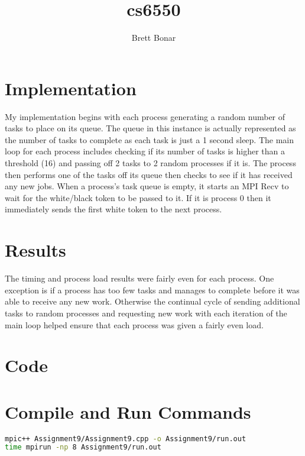 \documentclass{article}
\title{cs6550}
\author{ Brett Bonar }
\begin{document}
\maketitle

\section{Implementation}
My implementation begins with each process generating a random number of tasks to place on its queue. The queue in this instance is actually represented as the number of tasks to complete as each task is just a 1 second sleep.
The main loop for each process includes checking if its number of tasks is higher than a threshold (16) and passing off 2 tasks to 2 random processes if it is. The process then performs one of the tasks off its queue then checks to see if it has received any new jobs.
When a process's task queue is empty, it starts an MPI Recv to wait for the white/black token to be passed to it. If it is process 0 then it immediately sends the first white token to the next process.

\section{Results}
The timing and process load results were fairly even for each process. One exception is if a process has too few tasks and manages to complete before it was able to receive any new work. Otherwise the continual cycle of sending additional tasks to random processes and requesting new work with each iteration of the main loop helped ensure that each process was given a fairly even load.

\section{Code}



\section{Compile and Run Commands}
\begin{lstlisting}[language=bash]
mpic++ Assignment9/Assignment9.cpp -o Assignment9/run.out
time mpirun -np 8 Assignment9/run.out
\end{lstlisting}
\end{document}
